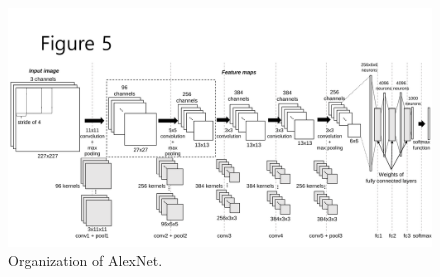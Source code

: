 \begin{figure}[htbp]
  \centering
  \includegraphics[width=\linewidth]{./figures/Alex}
  \caption{Organization of AlexNet.}
  \label{fig_Alex}
\end{figure}

